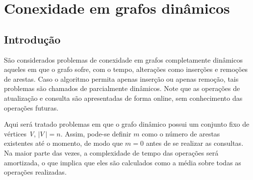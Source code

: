 
\chapter{Conexidade em grafos dinâmicos}

\section{Introdução}

São considerados problemas de conexidade em grafos completamente dinâmicos aqueles em que o grafo sofre, com o tempo, alterações como inserções e remoções 
de arestas. Caso o algoritmo permita apenas inserção ou apenas remoção, tais 
problemas são chamados de parcialmente dinâmicos. Note que as operações de 
atualização e consulta são apresentadas de forma online, sem conhecimento das  operações futuras. 

Aqui será tratado problemas em que o grafo dinâmico possui um conjunto fixo de vértices \textit{V}, $|\textit{V}\ | = n$. Assim, pode-se definir $m$ como o número de arestas existentes até o momento, de modo que $m = 0$ antes de se realizar as consultas. Na maior parte das vezes, a complexidade de tempo das operações será amortizada, o que implica que eles são calculados como a média sobre todas as operações realizadas. 



